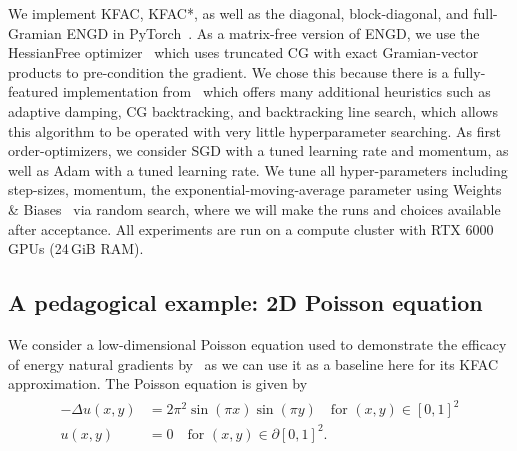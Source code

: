 


We implement KFAC, KFAC*, as well as the diagonal, block-diagonal, and
full-Gramian ENGD in PyTorch~\citep{paszke2019pytorch}.
As a matrix-free version of ENGD, we use the HessianFree optimizer~\citep{martens2010deep} which uses truncated CG with exact Gramian-vector products to pre-condition the gradient.
We chose this because there is a fully-featured implementation from~\citet{tatzel2022late} which offers many additional heuristics such as adaptive damping, CG backtracking, and backtracking line search, which allows this algorithm to be operated with very little hyperparameter searching.
As first order-optimizers, we consider SGD with a tuned learning rate and momentum, as well as Adam with a tuned learning rate.
%
We tune all hyper-parameters including step-sizes, momentum, the exponential-moving-average parameter using Weights \& Biases~\citep{wandb} via random search, where we will make the runs and choices available after acceptance.
All experiments are run on a compute cluster with RTX 6000 GPUs (24\,GiB RAM).


\subsection{A pedagogical example: 2D Poisson equation}

We consider a low-dimensional Poisson equation used to demonstrate the efficacy of energy natural gradients by~\cite{muller2023achieving}
as we can use it as a baseline here for its KFAC approximation.
The %
Poisson equation is given by
\begin{align}\label{eq:2D-Poisson}
    \begin{split}
        -\Delta u(x,y) & = 2\pi^2 \sin(\pi x) \sin(\pi y) \quad \text{for } (x,y)\in[0,1]^2 \\
    u(x,y) & = 0 \quad \text{for } (x,y) \in\partial[0,1]^2.
    \end{split}
\end{align}

